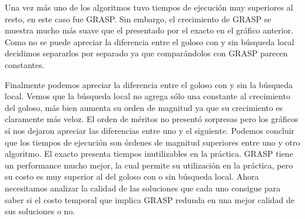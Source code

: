 Una vez más uno de los algoritmos tuvo tiempos de ejecución muy superiores al resto, en este caso fue GRASP.
Sin embargo, el crecimiento de GRASP se muestra mucho más suave que el presentado por el exacto en el gráfico anterior.
Como no se puede apreciar la diferencia entre el goloso con y sin búsqueda local decidimos separarlos por separado
ya que comparándolos con GRASP parecen constantes.
\begin{figure}[H]
    \begin{minipage}[t]{\linewidth}
		\centering
		\label{fig:ejercicio-6-comparacion-tiempos-menos-grasp}
    \end{minipage}
\end{figure}
Finalmente podemos apreciar la diferencia entre el goloso con y sin la búsqueda local. Vemos
que la búsqueda local no agrega sólo una constante al crecimiento del goloso, más bien aumenta 
su orden de magnitud ya que su crecimiento es claramente más veloz.
El orden de méritos no presentó sorpresas pero los gráficos sí nos dejaron apreciar las diferencias entre 
uno y el siguiente. Podemos concluir que los tiempos de ejecución son órdenes de magnitud superiores entre
uno y otro algoritmo. El exacto presenta tiempos inutilizables en la práctica. GRASP tiene un performance
mucho mejor, la cual permite su utilización en la práctica, pero su costo es muy superior al del goloso con o sin búsqueda local.
Ahora necesitamos analizar la calidad de las soluciones que cada uno consigue para saber si el costo
temporal que implica GRASP redunda en una mejor calidad de sus soluciones o no.

